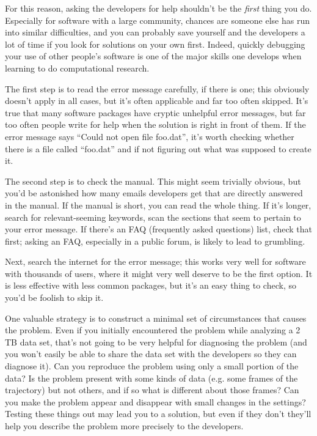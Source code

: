 \documentclass[9pt,training]{livecoms}
\begin{document}
For this reason, asking the developers for help shouldn't be the \emph{first}
thing you do. Especially for software with a large community, chances are
someone else has run into similar difficulties, and you can probably save
yourself and the developers a lot of time if you look for solutions on your own
first. Indeed, quickly debugging your use of other people's software is one of
the major skills one develops when learning to do computational research.

The first step is to read the error message carefully, if there is one; this
obviously doesn't apply in all cases, but it's often applicable and far too
often skipped. It's true that many software packages have cryptic unhelpful
error messages, but far too often people write for help when the solution is
right in front of them. If the error message says ``Could not open file
foo.dat'', it's worth checking whether there is a file called ``foo.dat'' and if
not figuring out what was supposed to create it.

The second step is to check the manual. This might seem trivially obvious, but
you'd be astonished how many emails developers get that are directly answered in
the manual. If the manual is short, you can read the whole thing. If it's
longer, search for relevant-seeming keywords, scan the sections that seem to
pertain to your error message. If there's an FAQ (frequently asked questions)
list, check that first; asking an FAQ, especially in a public forum, is likely
to lead to grumbling.

Next, search the internet for the error message; this works very well for
software with thousands of users, where it might very well deserve to be the
first option. It is less effective with less common packages, but it's an easy
thing to check, so you'd be foolish to skip it.

One valuable strategy is to construct a minimal set of circumstances that causes
the problem. Even if you initially encountered the problem while analyzing a 2
TB data set, that's not going to be very helpful for diagnosing the problem (and
you won't easily be able to share the data set with the developers so they can
diagnose it). Can you reproduce the problem using only a small portion of the
data? Is the problem present with some kinds of data (e.g. some frames of the
trajectory) but not others, and if so what is different about those frames? Can
you make the problem appear and disappear with small changes in the settings?
Testing these things out may lead you to a solution, but even if they don't
they'll help you describe the problem more precisely to the developers.
\end{document}
